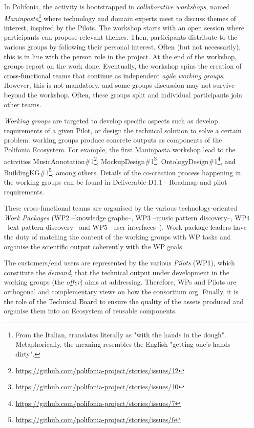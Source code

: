In Polifonia, the activity is bootstrapped in \textit{collaborative workshops}, named \textit{Maninpasta}\footnote{From the Italian, translates literally as "with the hands in the dough". Metaphorically, the meaning resembles the English "getting one's hands dirty".} where technology and domain experts meet to discuss themes of interest, inspired by the Pilots. 
The workshop starts with an open session where participants can propose relevant themes. 
Then, participants distribute to the various groups by following their personal interest.
Often (but not necessarily), this is in line with the person role in the project.
At the end of the workshop, groups report on the work done. 
Eventually, the workshop spins the creation of cross-functional teams that continue as independent \textit{agile working groups}. However, this is not mandatory, and some groups discussion may not survive beyond the workshop. Often, these groups split and individual participants join other teams.

\textit{Working groups} are targeted to develop specific aspects such as develop requirements of a given Pilot, or design the technical solution to solve a certain problem.
working groups produce concrete outputs as components of the Polifonia Ecosystem.
For example, the first Maninpasta workshop lead to the activities MusicAnnotation\#1\footnote{\url{https://github.com/polifonia-project/stories/issues/12}}, MockupDesign\#1\footnote{\url{https://github.com/polifonia-project/stories/issues/10}}, OntologyDesign\#1\footnote{\url{https://github.com/polifonia-project/stories/issues/7}}, and  BuildingKG\#1\footnote{\url{https://github.com/polifonia-project/stories/issues/6}}, among others.
Details of the co-creation process happening in the working groups can be found in Deliverable D1.1 - Roadmap and pilot requirements.

These cross-functional teams are organised by the various technology-oriented \textit{Work Packages} (WP2 --knowledge graphs--, WP3 --music pattern discovery--, WP4 --text pattern discovery-- and WP5 --user interfaces--). 
Work package leaders have the duty of matching the content of the working groups with WP tasks and organise the scientific output coherently with the WP goals.

The customers/end users are represented by the various \textit{Pilots} (WP1), which constitute the \textit{demand}, that the technical output under development in the working groups (the \textit{offer}) aims at addressing. 
Therefore, WPs and Pilots are orthogonal and complementary views on how the consortium org.
Finally, it is the role of the Technical Board to ensure the quality of the assets produced and organise them into an Ecosystem of reusable components.

